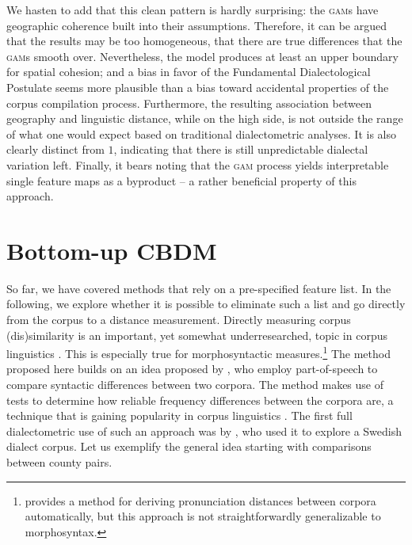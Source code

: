 \documentclass[output=paper]{LSP/langsci}
\begin{document}
We hasten to add that this clean pattern is hardly surprising: the \textsc{gam}s have geographic coherence built into their assumptions. 
Therefore, it can be argued that the results may be too homogeneous, that there are true differences that the \textsc{gam}s smooth over.
Nevertheless, the model produces at least an upper boundary for spatial cohesion; and a bias in favor of the Fundamental Dialectological Postulate seems more plausible than a bias toward accidental properties of the corpus compilation process.
Furthermore, the resulting association between geography and linguistic distance, while on the high side, is not outside the range of what one would expect based on traditional dialectometric analyses.
It is also clearly distinct from $1$, indicating that there is still unpredictable dialectal variation left.
Finally, it bears noting that the \textsc{gam} process yields interpretable single feature maps as a byproduct -- a rather beneficial property of this approach.

\section{Bottom-up CBDM} \label{bottomup}

So far, we have covered methods that rely on a pre-specified feature list.
In the following, we explore whether it is possible to eliminate such a list and go directly from the corpus to a distance measurement.
Directly measuring corpus (dis)similarity is an important, yet somewhat underresearched, topic in corpus linguistics \citep{kilgarriff_comparing_2001}.
This is especially true for morphosyntactic measures.\footnote{\citet{scherrer_recovering_2012} provides a method for deriving pronunciation distances between corpora automatically, but this approach is not straightforwardly generalizable to morphosyntax.}
The method proposed here builds on an idea proposed by \citet{nerbonne_measure_2006}, who employ part-of-speech  to compare syntactic differences between two corpora.
The method makes use of  tests to determine how reliable frequency differences between the corpora are, a technique that is gaining popularity in corpus linguistics \citep{lijffijt_computational_2013}.
The first full dialectometric use of such an approach was by \citet{sanders_statistical_2010}, who used it to explore a Swedish dialect corpus.
Let us exemplify the general idea starting with comparisons between county pairs.
\end{document}
